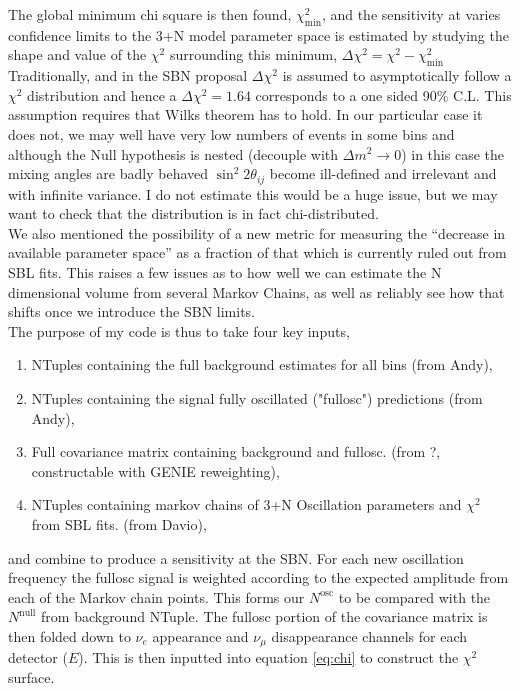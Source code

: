 \documentclass[12pt, a4paper]{article}
\begin{document}
The global minimum chi square is then found, $\chi^2_\text{min}$, and the sensitivity at varies confidence limits to the 3+N model parameter space is estimated by studying the shape and value of the $\chi^2$ surrounding this minimum, $\Delta \chi^2 = \chi^2 - \chi^2_\text{min}$ Traditionally, and in the SBN proposal $\Delta \chi^2$ is assumed to asymptotically follow a $\chi^2$ distribution and hence a $\Delta \chi^2 = 1.64$ corresponds to a one sided 90\% C.L.
 This assumption requires that Wilks theorem has to hold. In our particular case it does not, we may well have very low numbers of events in some bins and although the Null hypothesis is nested (decouple with $\Delta m^2 \rightarrow 0$) in this case the mixing angles are badly behaved $\sin^2 2 \theta_{ij}$ become ill-defined and irrelevant and with infinite variance. I do not estimate this would be a huge issue, but we may want to check that the distribution is in fact chi-distributed. \\

We also mentioned the possibility of a new metric for measuring the ``decrease in available parameter space'' as a fraction of that which is currently ruled out from SBL fits. This raises a few issues as to how well we can estimate the N dimensional volume from several Markov Chains, as well as reliably see how that shifts once we introduce the SBN limits.\\ 

The purpose of my code is thus to take four key inputs, 
\begin{enumerate}
	\item NTuples containing the full background estimates for all bins (from Andy),
	\item NTuples containing the signal fully oscillated ("fullosc") predictions (from Andy),
	\item Full covariance matrix containing background and fullosc. (from ?, constructable with GENIE reweighting),
	\item NTuples containing markov chains of 3+N Oscillation parameters and $\chi^2$ from SBL fits. (from Davio),
\end{enumerate}
and combine to produce a sensitivity at the SBN. For each new oscillation frequency the fullosc signal is weighted according to the expected amplitude from each of the Markov chain points. This forms our $N^\text{osc}$ to be compared with the $N^\text{null}$ from background NTuple. The  fullosc portion of the covariance matrix is then folded down to $\nu_e$ appearance and $\nu_\mu$ disappearance channels for each detector ($E$). This is then inputted into equation \ref{eq:chi} to construct the $\chi^2$ surface. \\
\end{document}
